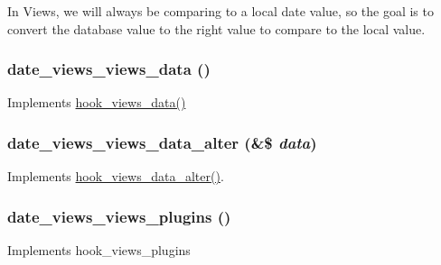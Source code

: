In Views, we will always be comparing to a local date value, so the goal is to convert the database value to the right value to compare to the local value. \hypertarget{date__views_8views_8inc_ad639fe30ca54804e01b7581bf2f3dac8}{
\subsubsection[{date\_\-views\_\-views\_\-data}]{\setlength{\rightskip}{0pt plus 5cm}date\_\-views\_\-views\_\-data ()}}
\label{date__views_8views_8inc_ad639fe30ca54804e01b7581bf2f3dac8}
Implements \hyperlink{group__views__hooks_ga227057901681e4a33e33c199c7a8c989}{hook\_\-views\_\-data()} \hypertarget{date__views_8views_8inc_aa64f1dee5e19f00557a74ff02c6ad624}{
\subsubsection[{date\_\-views\_\-views\_\-data\_\-alter}]{\setlength{\rightskip}{0pt plus 5cm}date\_\-views\_\-views\_\-data\_\-alter (\&\$ {\em data})}}
\label{date__views_8views_8inc_aa64f1dee5e19f00557a74ff02c6ad624}
Implements \hyperlink{group__views__hooks_ga6ae0bb0d2385e03c32b57625b6d35826}{hook\_\-views\_\-data\_\-alter()}. \hypertarget{date__views_8views_8inc_ac32ded8326bcca6885e284118e3c7b9b}{
\subsubsection[{date\_\-views\_\-views\_\-plugins}]{\setlength{\rightskip}{0pt plus 5cm}date\_\-views\_\-views\_\-plugins ()}}
\label{date__views_8views_8inc_ac32ded8326bcca6885e284118e3c7b9b}
Implements hook\_\-views\_\-plugins 
